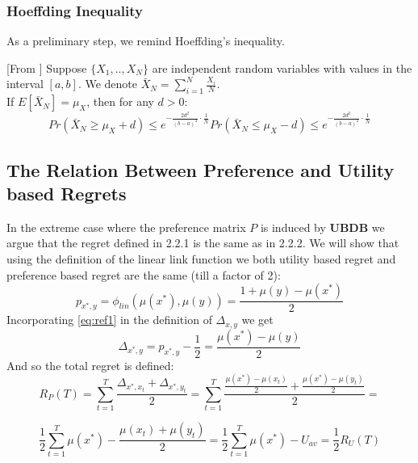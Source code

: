 \documentclass{llncs}
\begin{document}
	\subsubsection{Hoeffding Inequality}	
	As a preliminary step, we remind Hoeffding’s inequality.
	\begin{theorem}\label{thm:Hoeffding}[From \cite{...}]
	Suppose $\{X_1,..,X_N \}$ are independent random variables with values in the interval $[a,b]$.
	We denote $\bar{X}_N = \sum_{i=1}^N \frac{X_i}{N}$.\\
	If $E[\bar{X}_N] = \mu_X$, then for any $d>0$:
	\begin{subequations}
	\begin{equation}
	Pr(\bar{X}_N \geq \mu_X+ d) \leq e^{-\frac{2d^2}{(b-a)^2}\cdot\frac{1}{N}}
	\end{equation}
	\begin{equation}
	Pr(\bar{X}_N \leq \mu_X- d) \leq e^{-\frac{2d^2}{(b-a)^2}\cdot\frac{1}{N}}
	\end{equation}
	\end{subequations}
	\end{theorem}
	\subsection{The Relation Between Preference and Utility based Regrets}
	
	In the extreme case where the preference matrix $P$ is induced by \textbf{UBDB} we argue that the regret defined in 2.2.1 is the same as in 2.2.2. 
	We will show that using the definition of the linear link function we both utility based regret and preference based regret are the same (till a factor of 2): 
	\begin{equation}\label{eq:ref1}
		p_{x^*,y} = \phi_{lin}(\mu(x^*),\mu(y)) = \frac{1 +\mu(y)-\mu(x^*)}{2}
	\end{equation}
	Incorporating \eqref{eq:ref1} in the definition of $\Delta_{x,y}$ we get
	$$
	\Delta_{x^*,y} = p_{x^*,y} - \frac{1}{2} = \frac{\mu(x^*)-\mu(y)}{2}
	$$
	And so the total regret is defined:
	$$ R_P(T) = \sum_{t=1}^T \frac{\Delta_{x^*,x_t}+\Delta_{x^*,y_t}}{2} =  
\sum_{t=1}^T \frac{\frac{\mu(x^*)-\mu(x_t)}{2}+\frac{\mu(x^*)-\mu(y_t)}{2}}{2} =
$$

$$
\frac{1}{2} \sum_{t=1}^T \mu(x^*) -\frac{
	\mu(x_t)+\mu(y_t)}{2} =
\frac{1}{2} \sum_{t=1}^T \mu(x^*)- U_{av} = \frac{1}{2}R_U(T)$$
\end{document}
